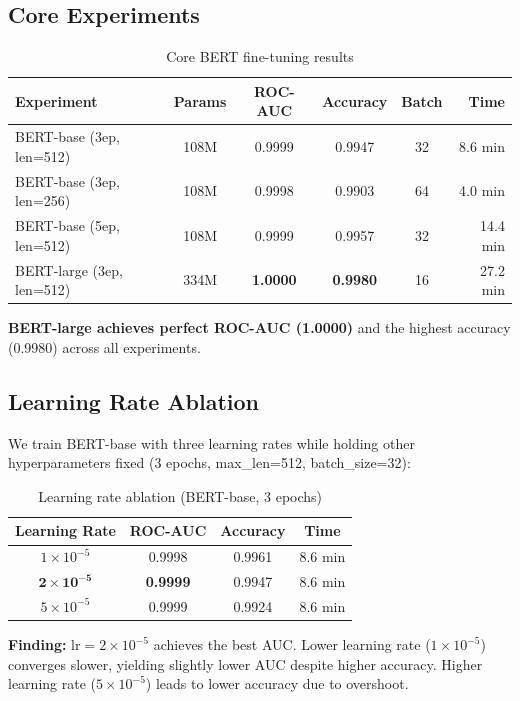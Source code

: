 \documentclass[11pt,a4paper]{article}
\begin{document}
\subsection{Core Experiments}

\begin{table}[H]
\centering
\caption{Core BERT fine-tuning results}
\label{tab:bert_core}
\begin{tabular}{lccccr}
\toprule
\textbf{Experiment} & \textbf{Params} & \textbf{ROC-AUC} & \textbf{Accuracy} & \textbf{Batch} & \textbf{Time} \\
\midrule
BERT-base (3ep, len=512)  & 108M & 0.9999 & 0.9947 & 32 & 8.6 min \\
BERT-base (3ep, len=256)  & 108M & 0.9998 & 0.9903 & 64 & 4.0 min \\
BERT-base (5ep, len=512)  & 108M & 0.9999 & 0.9957 & 32 & 14.4 min \\
BERT-large (3ep, len=512) & 334M & \textbf{1.0000} & \textbf{0.9980} & 16 & 27.2 min \\
\bottomrule
\end{tabular}
\end{table}

\textbf{BERT-large achieves perfect ROC-AUC (1.0000)} and the highest accuracy (0.9980) across all experiments.

\subsection{Learning Rate Ablation}

We train BERT-base with three learning rates while holding other hyperparameters fixed (3 epochs, max\_len=512, batch\_size=32):

\begin{table}[H]
\centering
\caption{Learning rate ablation (BERT-base, 3 epochs)}
\label{tab:lr_ablation}
\begin{tabular}{cccc}
\toprule
\textbf{Learning Rate} & \textbf{ROC-AUC} & \textbf{Accuracy} & \textbf{Time} \\
\midrule
$1 \times 10^{-5}$ & 0.9998 & 0.9961 & 8.6 min \\
$\mathbf{2 \times 10^{-5}}$ & \textbf{0.9999} & 0.9947 & 8.6 min \\
$5 \times 10^{-5}$ & 0.9999 & 0.9924 & 8.6 min \\
\bottomrule
\end{tabular}
\end{table}

\textbf{Finding:} $\text{lr}=2\times10^{-5}$ achieves the best AUC. Lower learning rate ($1\times10^{-5}$) converges slower, yielding slightly lower AUC despite higher accuracy. Higher learning rate ($5\times10^{-5}$) leads to lower accuracy due to overshoot.
\end{document}
